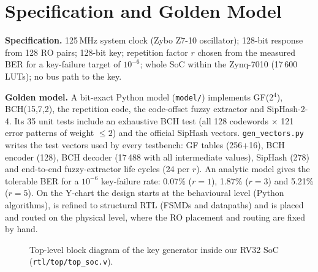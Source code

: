 \documentclass[11pt,a4paper]{article}
\begin{document}
\section{Specification and Golden Model}
\label{sec:spec}
\textbf{Specification.} 125\,MHz system clock (Zybo Z7-10 oscillator); 128-bit response from 128 RO
pairs; 128-bit key; repetition factor $r$ chosen from the measured BER for a key-failure target of
$10^{-6}$; whole SoC within the Zynq-7010 (17\,600 LUTs); no bus path to the key.

\textbf{Golden model.} A bit-exact Python model (\texttt{model/}) implements GF(2$^4$), BCH(15,7,2),
the repetition code, the code-offset fuzzy extractor and SipHash-2-4. Its 35 unit tests include an
exhaustive BCH test (all 128 codewords $\times$ 121 error patterns of weight $\le2$) and the official
SipHash vectors. \texttt{gen\_vectors.py} writes the test vectors used by every testbench: GF tables
(256+16), BCH encoder (128), BCH decoder (17\,488 with all intermediate values), SipHash (278) and
end-to-end fuzzy-extractor life cycles (24 per $r$). An analytic model gives the tolerable BER for a
$10^{-6}$ key-failure rate: 0.07\% ($r{=}1$), 1.87\% ($r{=}3$) and 5.21\% ($r{=}5$). On the Y-chart the
design starts at the behavioural level (Python algorithms), is refined to structural RTL (FSMDs and
datapaths) and is placed and routed on the physical level, where the RO placement and routing are fixed
by hand.

\begin{figure}[H]\centering
{}
\caption{Top-level block diagram of the key generator inside our RV32 SoC (\texttt{rtl/top/top\_soc.v}).}\label{fig:block}
\end{figure}
\end{document}
